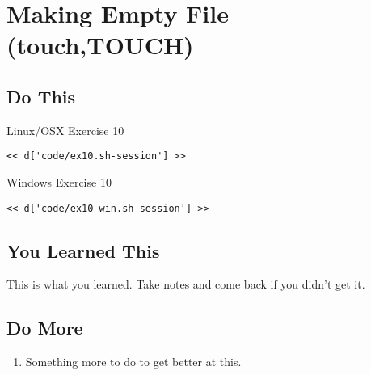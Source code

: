 \chapter{Making Empty File (touch,TOUCH)}

\section{Do This}

\begin{code}{Linux/OSX Exercise 10}
\begin{Verbatim}
<< d['code/ex10.sh-session'] >>
\end{Verbatim}
\end{code}

\begin{code}{Windows Exercise 10}
\begin{Verbatim}
<< d['code/ex10-win.sh-session'] >>
\end{Verbatim}
\end{code}

\section{You Learned This}

This is what you learned.  Take notes and come back if you didn't get it.

\section{Do More}

\begin{enumerate}
\item Something more to do to get better at this.
\end{enumerate}

